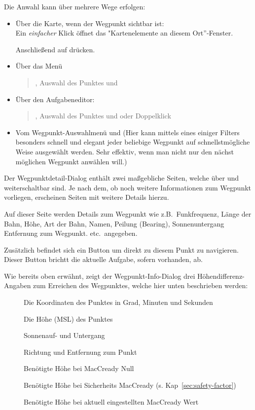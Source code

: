 Die Anwahl  kann über mehrere Wege erfolgen:
\begin{itemize}\itemsep=1em
\item
Über die Karte, wenn der Wegpunkt sichtbar ist: \\
Ein \textit{einfacher} Klick öffnet das "Kartenelemente an diesem Ort''-Fenster.

Anschließend auf  drücken.
%
%
\item
Über das Menü
\begin{quote}
\blink{}, Auswahl des Punktes und 
\end{quote}
%
%
\item Über den Aufgabeneditor: 
\begin{quote}
\blink{}\blink{}\blink{}, Auswahl des Punktes und  oder Doppelklick 
\end{quote}
%
%
\item%
Vom Wegpunkt-Auswahlmenü \blink{} und 
(Hier kann mittels eines einiger Filters besonders schnell und elegant jeder beliebige Wegpunkt auf schnellstmögliche Weise ausgewählt werden. Sehr effektiv, wenn man nicht nur den nächst möglichen Wegpunkt anwählen will.)
%
%
\end{itemize}

Der Wegpunktdetail-Dialog enthält zwei maßgebliche Seiten, welche über \button{$>$} und  \button{$<$} weiterschaltbar sind. Je nach dem, ob noch weitere Informationen zum Wegpunkt vorliegen, erscheinen Seiten mit weitere Details hierzu.

Auf dieser Seite werden Details zum Wegpunkt wie z.B.\ Funkfrequenz, Länge der Bahn, Höhe, Art der Bahn, Namen, Peilung (Bearing), Sonnenuntergang Entfernung zum Wegpunkt. etc.\ angegeben.

Zusätzlich befindet sich ein Button  um direkt zu diesem Punkt zu navigieren.  Dieser Button brichtt die aktuelle Aufgabe, sofern vorhanden, ab.

Wie bereits oben erwähnt, zeigt der Wegpunkt-Info-Dialog drei Höhendifferenz-Angaben zum Erreichen des Wegpunktes, welche hier unten beschrieben werden:

\begin{description}
\item[] Die Koordinaten des Punktes in Grad, Minuten und Sekunden
\item[] Die Höhe (MSL) des Punktes
\item[] Sonnenauf- und Untergang
\item[] Richtung und Entfernung zum Punkt
\item[] Benötigte Höhe bei MacCready Null
\item[] Benötigte Höhe bei Sicherheits MacCready (s. Kap~\ref{sec:safety-factor})
\item[] Benötigte Höhe bei  aktuell eingestellten MacCready Wert
\end{description}

